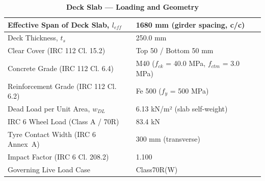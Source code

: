\documentclass[12pt,a4paper]{report}
\numberwithin{table}{chapter}
\numberwithin{figure}{chapter}
\begin{document}
\vspace{1em}
\begin{longtable}{|L{5.5cm}|p{10.0cm}|}
\caption{\textbf{Deck Slab --- Loading and Geometry}}
\hline
\textnormal{Effective Span of Deck Slab, $l_{eff}$} & 1680 mm (girder spacing, c/c) \\[6pt]
\hline
\textnormal{Deck Thickness, $t_s$} & 250.0 mm \\[6pt]
\hline
\textnormal{Clear Cover (IRC 112 Cl. 15.2)} & Top 50 / Bottom 50 mm \\[6pt]
\hline
\textnormal{Concrete Grade (IRC 112 Cl. 6.4)} & M40 ($f_{ck}$ = 40.0 MPa, $f_{ctm}$ = 3.0 MPa) \\[6pt]
\hline
\textnormal{Reinforcement Grade (IRC 112 Cl. 6.2)} & Fe 500 ($f_y$ = 500 MPa) \\[6pt]
\hline
\textnormal{Dead Load per Unit Area, $w_{DL}$} & 6.13 kN/m² (slab self-weight) \\[6pt]
\hline
\textnormal{IRC 6 Wheel Load (Class A / 70R)} & 83.4 kN \\[6pt]
\hline
\textnormal{Tyre Contact Width (IRC 6 Annex~A)} & 300 mm (transverse) \\[6pt]
\hline
\textnormal{Impact Factor (IRC 6 Cl. 208.2)} & 1.100 \\[6pt]
\hline
\textnormal{Governing Live Load Case} & Class70R(W) \\[6pt]
\hline
\end{longtable}
\end{document}

